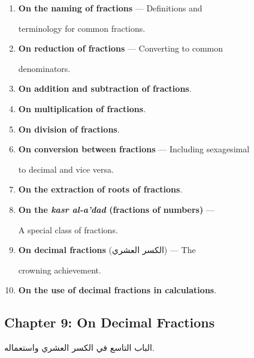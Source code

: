 \documentclass[11pt,a4paper]{article}
\newenvironment{arabicbox}{%

  \begin{framed}

  \begin{minipage}{\linewidth-2\fboxsep-2\fboxrule}

  \setlength{\parindent}{0pt}

  \linespread{1.3}\selectfont

}{%

  \end{minipage}

  \end{framed}

}
\newcommand{\ar}[1]{{\arabicfont\beginR #1\endR}}
\begin{document}
\begin{enumerate}[label=\textbf{Ch.\arabic*:}]

  \item \textbf{On the naming of fractions} --- Definitions and

  terminology for common fractions.

  \item \textbf{On reduction of fractions} --- Converting to common

  denominators.

  \item \textbf{On addition and subtraction of fractions}.

  \item \textbf{On multiplication of fractions}.

  \item \textbf{On division of fractions}.

  \item \textbf{On conversion between fractions} --- Including sexagesimal

  to decimal and vice versa.

  \item \textbf{On the extraction of roots of fractions}.

  \item \textbf{On the \textit{kasr al-a'dad} (fractions of numbers)} ---

  A special class of fractions.

  \item \textbf{On decimal fractions} (\ar{الكسر العشري}) --- The

  crowning achievement.

  \item \textbf{On the use of decimal fractions in calculations}.

\end{enumerate}



\subsection{Chapter 9: On Decimal Fractions}



\begin{arabicbox}

\begin{Arabic}

الباب التاسع في الكسر العشري واستعماله.

\end{Arabic}

\end{arabicbox}
\end{document}

